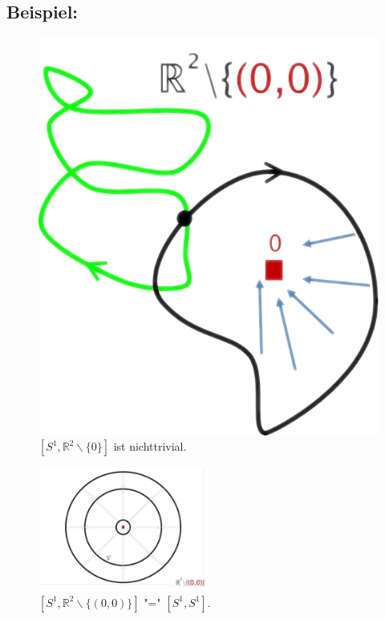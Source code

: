 \documentclass[a4paper,11pt,notitlepage]{report}
\theoremstyle{definition}
\newcommand{\R}{{\ensuremath{\mathbb{R}}}}
\newenvironment{bsp}[1]
{
\setlength{\fboxsep}{10pt}
\subsection*{Beispiel: #1}
\begin{upshape}
}
{
\end{upshape}
}
\begin{document}
\begin{bsp}{}
\begin{figure}[h]
\centering
\includegraphics[scale=0.4]{images/Homotop_Schleifen_R_ohne_0.png}
\caption{$[S^1, \R^2 \backslash \{0\}]$ ist nichttrivial.}
\end{figure}
\end{bsp}

\begin{figure}[h]
\centering
\includegraphics[width=0.5\textwidth]{images/S1_und_R2_ohne_0.png}
\caption{$[S^1,\R^2\backslash\{(0,0)\}]\text{ "=" }[S^1,S^1]$.}
\end{figure}



\newpage
\renewcommand{\thechapter}{\Roman{chapter}}
\end{document}

